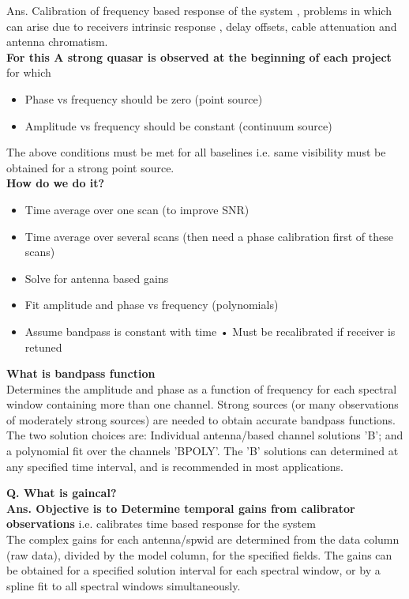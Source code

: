\documentclass[10pt]{report}
\newcommand{\tbf}[1]{\textbf{#1}}
\begin{document}
Ans. Calibration of frequency based response of the system , problems in which can arise due to receivers intrinsic response , delay offsets, cable attenuation and antenna chromatism.\\

\tbf{ For this A strong quasar is observed at the beginning of each project} for which
\begin{itemize}
\item Phase vs frequency should be zero (point source) 
\item Amplitude vs frequency should be constant (continuum source)
\end{itemize}

The above conditions must be met for all baselines i.e. same visibility must be obtained for a strong point source. \\

\tbf{How do we do it?}\\
\begin{itemize}
\item Time average over one scan (to improve SNR) 
\item  Time average over several scans (then need a phase calibration first of these scans) 
\item Solve for antenna based gains
\item Fit amplitude and phase vs frequency (polynomials)
\item Assume bandpass is constant with time • Must be recalibrated if receiver is retuned
\end{itemize}
\tbf{What is bandpass function}\\
Determines the amplitude and phase as a function of frequency for each spectral window containing more than one channel. Strong sources (or many observations of moderately strong sources) are needed to obtain accurate bandpass functions. The two solution choices are: Individual antenna/based channel solutions 'B'; and a polynomial fit over the channels 'BPOLY'. The 'B' solutions can determined at any specified time interval, and is recommended in most applications. 

\tbf{Q. What is gaincal?}\\

\tbf{Ans. Objective is to Determine temporal gains from calibrator observations} i.e. calibrates time based response for the system\\
The complex gains for each antenna/spwid are determined from the data column (raw data), divided by the model column, for the specified fields. The gains can be obtained for a specified solution interval for each spectral window, or by a spline fit to all spectral windows simultaneously.\\
\end{document}
